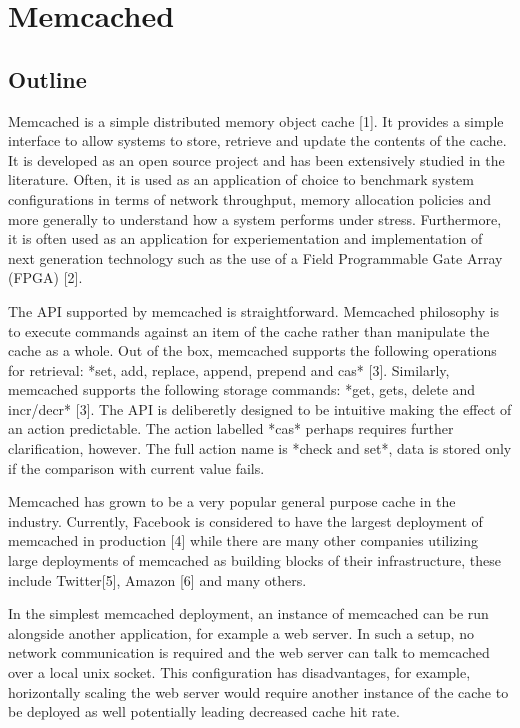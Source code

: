 \section{Memcached}

\subsection{Outline}
Memcached is a simple distributed memory object cache [1]. It provides a simple interface to allow systems to store, retrieve and update the contents of the cache. It is developed as an open source project and has been extensively studied in the literature. Often, it is used as an application of choice to benchmark system configurations in terms of network
throughput, memory allocation policies and more generally to understand how a system performs under stress. Furthermore, it is often used as an application for experiementation and implementation of next generation technology such as the use of a Field Programmable Gate Array (FPGA) [2].

The API supported by memcached is straightforward. Memcached philosophy is to execute commands against an item of the cache rather than manipulate the cache as a whole. Out of the box, memcached supports the following operations for retrieval: *set, add, replace, append, prepend and cas* [3]. Similarly, memcached supports the following storage commands: *get, gets, delete and incr/decr* [3]. The API is deliberetly designed to be intuitive making the effect of an action predictable. The action labelled *cas* perhaps requires further clarification, however. The full action name is *check and set*, data is stored only if the comparison with current value fails.

Memcached has grown to be a very popular general purpose cache in the industry. Currently, Facebook is considered to have the largest deployment of memcached in production [4] while there are many other companies utilizing large deployments of memcached as building blocks of their infrastructure, these include Twitter[5], Amazon [6] and many others.

In the simplest memcached deployment, an instance of memcached can be run alongside another application, for example a web server. In such a setup, no network communication is required and the web server can talk to memcached over a local unix socket. This configuration has disadvantages, for example, horizontally scaling the web server would require another instance of the cache to be deployed as well potentially leading decreased cache hit rate.

